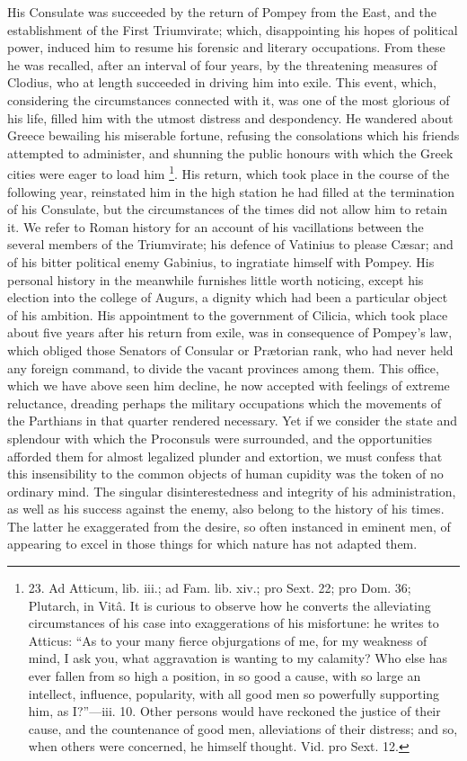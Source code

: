 His Consulate was succeeded by
the return of Pompey from the East, and the establishment of the First
Triumvirate; which, disappointing his hopes of political power,
induced him to resume his forensic and literary occupations. From
these he was recalled, after an interval of four years, by the
threatening measures of Clodius, who at length succeeded in driving
him into exile. This event, which, considering the circumstances
connected with it, was one of the most glorious of his life, filled
him with the utmost distress and despondency. He wandered about Greece
bewailing his miserable fortune, refusing the consolations which his
friends attempted to administer, and shunning the public honours with
which the Greek cities were eager to load him \footnote{23. Ad Atticum, lib. iii.; ad
Fam. lib. xiv.; pro Sext. 22; pro Dom. 36; Plutarch, in Vitâ. It is
curious to observe how he converts the alleviating circumstances of
his case into exaggerations of his misfortune: he writes to Atticus: ``As
to your many fierce objurgations of me, for my weakness of mind, I ask
you, what aggravation is wanting to my calamity? Who else has ever
fallen from so high a position, in so good a cause, with so large an
intellect, influence, popularity, with all good men so powerfully
supporting him, as I?''—iii. 10. Other persons would have reckoned
the justice of their cause, and the countenance of good men,
alleviations of their distress; and so, when others were concerned, he
himself thought. Vid. pro Sext. 12.}. His return, which took place in the course of the following
year, reinstated him in the high station he had filled at the
termination of his Consulate, but the circumstances of the times
did not allow him to retain it. We refer to Roman history for an
account of his vacillations between the several members of the
Triumvirate; his defence of Vatinius to please Cæsar; and of his
bitter political enemy Gabinius, to ingratiate himself with Pompey.
His personal history in the meanwhile furnishes little worth noticing,
except his election into the college of Augurs, a dignity which had
been a particular object of his ambition. His appointment to the
government of Cilicia, which took place about five years after his
return from exile, was in consequence of Pompey's law, which obliged
those Senators of Consular or Prætorian rank, who had never held any
foreign command, to divide the vacant provinces among them. This
office, which we have above seen him decline, he now accepted with
feelings of extreme reluctance, dreading perhaps the military
occupations which the movements of the Parthians in that quarter
rendered necessary. Yet if we consider the state and splendour with
which the Proconsuls were surrounded, and the opportunities afforded
them for almost legalized plunder and extortion, we must confess that
this insensibility to the common objects of human cupidity was the
token of no ordinary mind. The singular disinterestedness and
integrity of his administration, as well as his success against the
enemy, also belong to the history of his times. The latter he
exaggerated from the desire, so often instanced in eminent men, of
appearing to excel in those things for which nature has not adapted
them.

